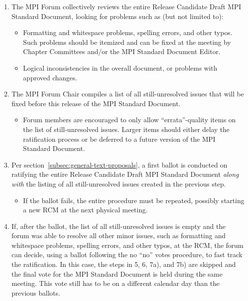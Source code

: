 {{\begin{enumerate}
\begin{enumerate}
  \item The MPI Forum collectively reviews the entire Release
    Candidate Draft MPI Standard Document, looking for problems such
    as (but not limited to):
    \begin{itemize}
    \item Formatting and whitespace problems, spelling errors, and
      other typos.  Such problems should be itemized and can be fixed
      at the meeting by Chapter Committees and/or the MPI Standard
      Document Editor.
    \item Logical inconsistencies in the overall document, or problems
      with approved changes.
    \end{itemize}

  \item The MPI Forum Chair compiles a list of all still-unresolved
    issues that will be fixed before this release of the MPI Standard
    Document.
    \begin{itemize}
    \item Forum members are encouraged to only allow
      ``errata''-quality items on the list of still-unresolved
      issues.  Larger items should either delay the ratification
      process or be deferred to a future version of the MPI Standard
      Document.
    \end{itemize}

  \item Per section~\ref{subsec:general-text-proposals}, a first
    ballot is conducted on ratifying the entire Release Candidate
    Draft MPI Standard Document {\em along with} the listing of all
    still-unresolved issues created in the previous step.
    \begin{itemize}
    \item If the ballot fails, the entire procedure must be repeated,
      possibly starting a new RCM at the next physical meeting.
    \end{itemize}
    
  \item {\color{blue} If, after the ballot, the list of all still-unresolved issues is empty and the forum was able to resolve all other minor issues, such {\color{green}as} formatting and whitespace problems, spelling errors, and
      other typos, at the RCM, the forum can decide, using a ballot following the no ``no'' votes procedure, to fast track the ratification. In this case, the steps in 5, 6, 7a), and 7b) are skipped and the final vote for the MPI Standard Document is held during the same meeting. This vote still has to be on a different calendar day than the previous ballots.}
  \end{enumerate}


\end{enumerate}}}
